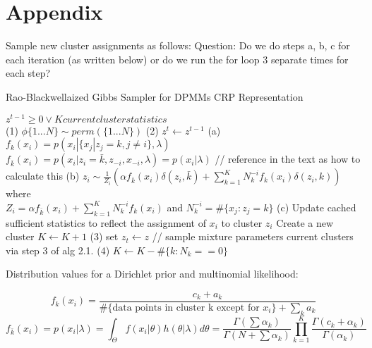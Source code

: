 \section{Appendix}

Sample new cluster assignments as follows:
Question: Do we do steps a, b, c for each iteration (as written below) or do we run the for loop 3 separate times for each step?
\begin{algorithm}
\caption{Rao-Blackwellaized Gibbs Sampler for DPMMs CRP Representation \cite{Sudderth:aa}}
\begin{algorithmic} 
\REQUIRE $z^{t-1} \geq 0 \vee K current cluster statistics$ \\
\STATE (1) $\phi\{1...N\} \sim perm(\{1...N\})$
\STATE (2) $z^{t} \leftarrow z^{t-1} $
\STATE (a)
\STATE $f_{k}(x_i) = p(x_i | \{x_j | z_j = k, j \neq i\}, \lambda)$ 
\ENDFOR
\STATE $f_{\bar{k}}(x_i) = p(x_i | z_i = \bar{k}, z_{-i}, x_{-i}, \lambda) = p(x_i | \lambda)$ // reference in the text as how to calculate this
\STATE (b) $z_i \sim \frac{1}{Z_i} (  \alpha f_{\bar{k}}(x_i) \delta(z_i, \bar{k}) + \sum_{k=1}^K N_k^{-i}  f_k(x_i) \delta(z_i, k) ) $ where \\
$ Z_i = \alpha f_{\bar{k}}(x_i) + \sum_{k=1}^K N_k^{-i} f_k(x_i)  $ and $ N_k^{-i} = \# \{x_j : z_j = k\} $
\STATE (c) Update cached sufficient statistics to reflect the assignment of $x_i$ to cluster $z_i$
\STATE Create a new cluster
\STATE $K \leftarrow K + 1$
\ENDIF 
\ENDFOR 
\STATE (3) set $ z_t \leftarrow z$ // sample mixture parameters current clusters via step 3 of alg 2.1. \cite{Sudderth:aa}
\STATE (4) $K \leftarrow K - \#\{ k : N_k == 0 \} $
\end{algorithmic}
\end{algorithm}

Distribution values for a Dirichlet prior and multinomial likelihood:

$$ f_k(x_i) = \frac{  c_k + a_k }{  \#\{ \text{data points in cluster k except for } x_i \} + \sum_k a_k }  $$
$$ f_{\bar{k}}(x_i) = p(x_i | \lambda) = \int_{\Theta} f(x_i | \theta) h(\theta | \lambda) d \theta = \frac{ \Gamma(\sum \alpha_k) }{\Gamma(N + \sum \alpha_k)} \prod_{k=1}^K \frac{\Gamma(c_k + \alpha_k)}{\Gamma(\alpha_k)}  $$